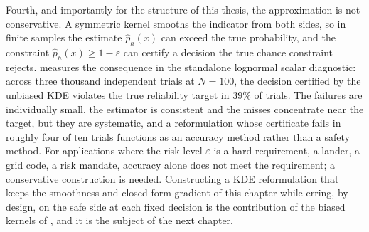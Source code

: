 Fourth, and importantly for the structure of this thesis, the
approximation is not conservative. A symmetric kernel smooths the
indicator from both sides, so in finite samples the estimate
$\hat{p}_h(x)$ can exceed the true probability, and the constraint
$\hat{p}_h(x) \geq 1-\varepsilon$ can certify a decision the true chance
constraint rejects.  measures the consequence in the
standalone lognormal scalar diagnostic: across three thousand independent trials at
$N = 100$, the decision certified by the unbiased KDE violates the true
reliability target in $39\%$ of trials. The failures are individually
small, the estimator is consistent and the misses concentrate near the
target, but they are systematic, and a reformulation whose certificate
fails in roughly four of ten trials functions as an accuracy method
rather than a safety method. For applications where the risk level $\varepsilon$ is a
hard requirement, a lander, a grid code, a risk mandate, accuracy alone
does not meet the requirement; a conservative construction is needed. Constructing a KDE reformulation that keeps the
smoothness and closed-form gradient of this chapter while erring, by
design, on the safe side at each fixed decision
is the contribution of the biased kernels of \citet{keil2021}, and it is
the subject of the next chapter.
